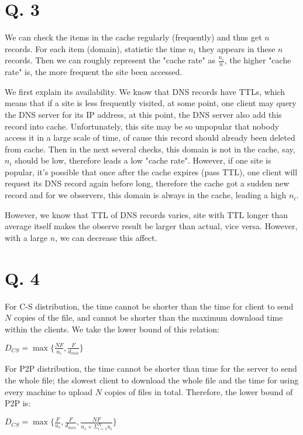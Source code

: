 \documentclass[onecolumn, oneside, ctexart]{SUSTechHomework}
\begin{document}
\section*{Q. 3}
We can check the items in the cache regularly (frequently) and thus get $n$ records. For each item (domain), statistic the time $n_i$ they appears in these $n$ records. Then we can roughly represent the "cache rate" as $\frac{n_i}{n}$, the higher "cache rate" is, the more frequent the site been accessed.
\par We first explain its availability. We know that DNS records have TTLs, which means that if a site is less frequently visited, at some point, one client may query the DNS server for its IP address, at this point, the DNS server also add this record into cache. Unfortunately, this site may be so unpopular that nobody access it in a large scale of time, of cause this record should already been deleted from cache. Then in the next several checks, this domain is not in the cache, say, $n_i$ should be low, therefore leads a low "cache rate". However, if one site is popular, it's possible that once after the cache expires (pass TTL), one client will request its DNS record again before long, therefore the cache got a sudden new record and for we observers, this domain is always in the cache, leading a high $n_i$.
\par However, we know that TTL of DNS records varies, site with TTL longer than average itself makes the observe result be larger than actual, vice versa. However, with a large $n$, we can decrease this affect.

\section*{Q. 4}
For C-S distribution, the time cannot be shorter than the time for client to send $N$ copies of the file, and cannot be shorter than the maximum download time within the clients. We take the lower bound of this relation:\\
\centerline{$D_{CS}=\max\{\frac{NF}{u_s},\frac{F}{d_{min}}\}$}
\par For P2P distribution, the time cannot be shorter than time for  the server to send the whole file;  the slowest client to download the whole file and  the time for using every machine to upload $N$ copies of files in total. Therefore, the lower bound of P2P is:\\
\centerline{$D_{CS}=\max\{\frac{F}{u_s},\frac{F}{d_{min}},\frac{NF}{u_s+\Sigma_{i=1}^{N}u_i}\}$}
\end{document}
